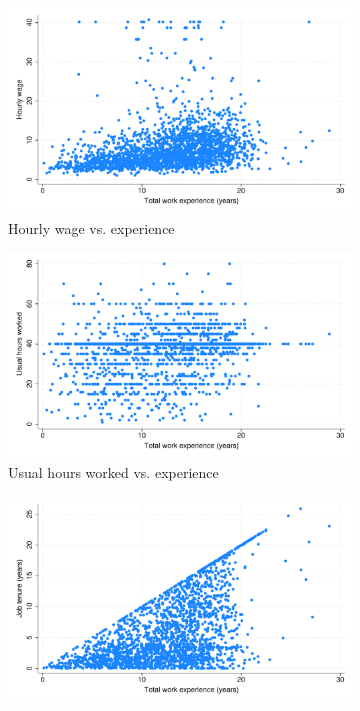 \documentclass{article}
\begin{document}
\begin{figure}[H] 
\centering 
  \caption{Four Scatterplots of different variables vs. experience using the subfigure subcommand} 
\begin{subfigure}{.45\textwidth}
  \includegraphics[width = 1.00\textwidth]{./figures/scatter_wage.pdf}  
  \caption{Hourly wage vs. experience}
\end{subfigure}
\begin{subfigure}{.45\textwidth}
  \includegraphics[width = 1.00\textwidth]{./figures/scatter_hours.pdf}  
  \caption{Usual hours worked vs. experience}
\end{subfigure}
\begin{subfigure}{.45\textwidth}
  \includegraphics[width = 1.00\textwidth]{./figures/scatter_tenure.pdf}  

\end{subfigure}
\end{figure}
\end{document}
